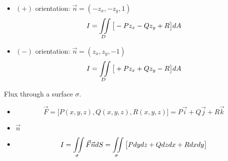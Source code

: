 \begin{multicols}{2}
      \begin{itemize}
        \item $(+)$ orientation: $\vec{n} = (-z_{x}, -z_{y}, 1)$
          \begin{equation}
            I = \iint \limits_{D} \big[-Pz_{x} - Qz_{y} + R\big] dA
          \end{equation}
        \item $(-)$ orientation: $\vec{n} = (z_{x}, z_{y}, -1)$
          \begin{equation}
            I = \iint \limits_{D} \big[+Pz_{x} + Qz_{y} - R\big] dA
          \end{equation}
      \end{itemize}

      \par Flux through a surface $\sigma$.
      \begin{itemize}
        \item {}
          \begin{equation*}
            \vec{F} = \big[P(x, y, z), Q(x, y, z), R(x, y, z)\big]
                    = P\vec{i} + Q\vec{j} + R\vec{k}
          \end{equation*}
        \item {} $\vec{n}$
        \item {}
          \begin{equation}
            I = \iint \limits_{\sigma} \vec{F}\vec{n}dS
              = \iint \limits_{\sigma} \big[Pdydz + Qdzdx + Rdxdy\big]
          \end{equation}
      \end{itemize}


\end{multicols}